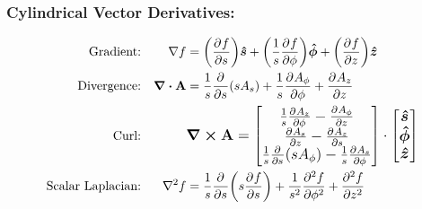     \subsubsection*{Cylindrical Vector Derivatives:}
    {\setlength\jot{0.7cm}
        \renewcommand{\arraystretch}{2.2}
    
        \begin{align*}
        \text{Gradient:}&&%
            \nabla f &= 
                \qty(\pder{f}{s})\e{s}+
                \qty(\oo{s} \pder{f}{\phi})\e{\phi}+
                \qty(\pder{f}{z})\e{z}
            \\
        \text{Divergence:}&&%
            \div\vb{A} &= \oo{s}\pder{s}\qty(s A_s) + \oo{s}\pder{A_\phi}{\phi}  + \pder{A_z}{z}
            \\
        \text{Curl:}&&%
            &\mathlarger{\curl \vb{A} = 
            \qty[
            \begin{matrix}
                \oo{s} \pder{A_z}{\phi} - \pder{A_\phi}{z}
                \\
                \pder{A_s}{z} - \pder{A_z}{s}
                \\
                \oo{s}\pder{s}\qty(s A_\phi) - \oo{s}\pder{A_s}{\phi}
            \end{matrix}
            ]\cdot\qty[
            \begin{matrix}
                \e{s}\\\e{\phi}\\\e{z}
            \end{matrix}
            ]}
            \\
            \text{Scalar Laplacian:}&&%
            \nabla^2 f
            &=\oo{s}\pder{s}\qty(s\pder{f}{s}) 
            + \oo{{s}^2}\pder[2]{f}{\phi} 
            + \pder[2]{f}{z} 
        \end{align*}
    }
%